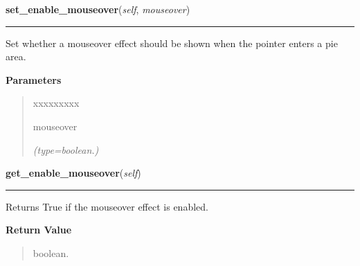     \label{pygtk_chart:pie_chart:PieChart:set_enable_mouseover}

    \vspace{0.5ex}

\hspace{.8\funcindent}\begin{boxedminipage}{\funcwidth}

    \raggedright \textbf{set\_enable\_mouseover}(\textit{self}, \textit{mouseover})

    \vspace{-1.5ex}

    \rule{\textwidth}{0.5\fboxrule}
\setlength{\parskip}{2ex}
    Set whether a mouseover effect should be shown when the pointer enters 
    a pie area.

\setlength{\parskip}{1ex}
      \textbf{Parameters}
      \vspace{-1ex}

      \begin{quote}
        \begin{Ventry}{xxxxxxxxx}

          \item[mouseover]

            {\it (type=boolean.)}

        \end{Ventry}

      \end{quote}

    \end{boxedminipage}

    \label{pygtk_chart:pie_chart:PieChart:get_enable_mouseover}

    \vspace{0.5ex}

\hspace{.8\funcindent}\begin{boxedminipage}{\funcwidth}

    \raggedright \textbf{get\_enable\_mouseover}(\textit{self})

    \vspace{-1.5ex}

    \rule{\textwidth}{0.5\fboxrule}
\setlength{\parskip}{2ex}
    Returns True if the mouseover effect is enabled.

\setlength{\parskip}{1ex}
      \textbf{Return Value}
    \vspace{-1ex}

      \begin{quote}
      boolean.

      \end{quote}

    \end{boxedminipage}


